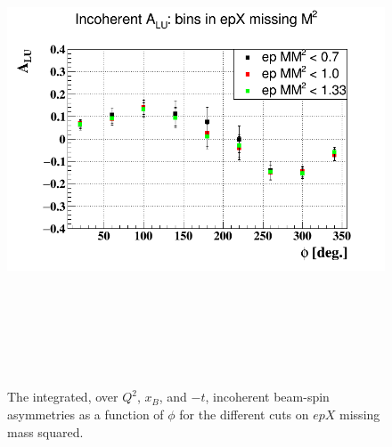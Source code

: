 \begin{enumerate}
\begin{enumerate}
   \begin{figure}[tbp]
    \includegraphics[height=14.6cm]{fig/BSA_incoherent_epMM.png}
    \caption{ The integrated, over $Q^{2}$, $x_{B}$, and $-t$, incoherent 
    beam-spin asymmetries as a function of $\phi$ for the different cuts on 
 $epX$ missing mass squared.}
    \label{fig:BSA_incoherent_epMM}
    \end{figure}                                                                  



\end{enumerate}
\end{enumerate}
